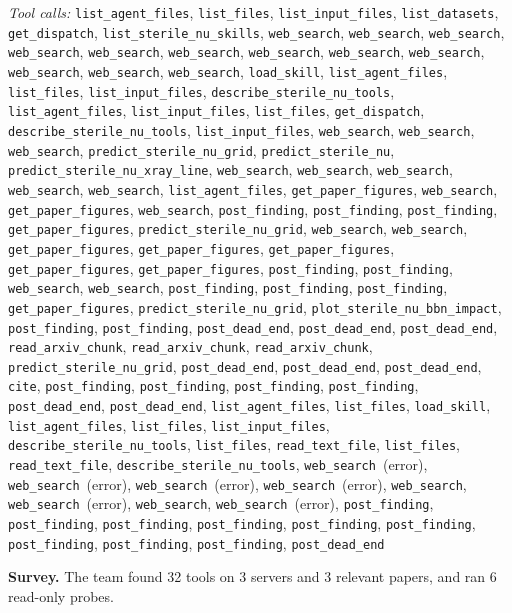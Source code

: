 \documentclass[11pt,a4paper]{article}
\begin{document}
\textit{Tool calls:} \texttt{list\_agent\_files}, \texttt{list\_files}, \texttt{list\_input\_files}, \texttt{list\_datasets}, \texttt{get\_dispatch}, \texttt{list\_sterile\_nu\_skills}, \texttt{web\_search}, \texttt{web\_search}, \texttt{web\_search}, \texttt{web\_search}, \texttt{web\_search}, \texttt{web\_search}, \texttt{web\_search}, \texttt{web\_search}, \texttt{web\_search}, \texttt{web\_search}, \texttt{web\_search}, \texttt{web\_search}, \texttt{load\_skill}, \texttt{list\_agent\_files}, \texttt{list\_files}, \texttt{list\_input\_files}, \texttt{describe\_sterile\_nu\_tools}, \texttt{list\_agent\_files}, \texttt{list\_input\_files}, \texttt{list\_files}, \texttt{get\_dispatch}, \texttt{describe\_sterile\_nu\_tools}, \texttt{list\_input\_files}, \texttt{web\_search}, \texttt{web\_search}, \texttt{web\_search}, \texttt{predict\_sterile\_nu\_grid}, \texttt{predict\_sterile\_nu}, \texttt{predict\_sterile\_nu\_xray\_line}, \texttt{web\_search}, \texttt{web\_search}, \texttt{web\_search}, \texttt{web\_search}, \texttt{web\_search}, \texttt{list\_agent\_files}, \texttt{get\_paper\_figures}, \texttt{web\_search}, \texttt{get\_paper\_figures}, \texttt{web\_search}, \texttt{post\_finding}, \texttt{post\_finding}, \texttt{post\_finding}, \texttt{get\_paper\_figures}, \texttt{predict\_sterile\_nu\_grid}, \texttt{web\_search}, \texttt{web\_search}, \texttt{get\_paper\_figures}, \texttt{get\_paper\_figures}, \texttt{get\_paper\_figures}, \texttt{get\_paper\_figures}, \texttt{get\_paper\_figures}, \texttt{post\_finding}, \texttt{post\_finding}, \texttt{web\_search}, \texttt{web\_search}, \texttt{post\_finding}, \texttt{post\_finding}, \texttt{post\_finding}, \texttt{get\_paper\_figures}, \texttt{predict\_sterile\_nu\_grid}, \texttt{plot\_sterile\_nu\_bbn\_impact}, \texttt{post\_finding}, \texttt{post\_finding}, \texttt{post\_dead\_end}, \texttt{post\_dead\_end}, \texttt{post\_dead\_end}, \texttt{read\_arxiv\_chunk}, \texttt{read\_arxiv\_chunk}, \texttt{read\_arxiv\_chunk}, \texttt{predict\_sterile\_nu\_grid}, \texttt{post\_dead\_end}, \texttt{post\_dead\_end}, \texttt{post\_dead\_end}, \texttt{cite}, \texttt{post\_finding}, \texttt{post\_finding}, \texttt{post\_finding}, \texttt{post\_finding}, \texttt{post\_dead\_end}, \texttt{post\_dead\_end}, \texttt{list\_agent\_files}, \texttt{list\_files}, \texttt{load\_skill}, \texttt{list\_agent\_files}, \texttt{list\_files}, \texttt{list\_input\_files}, \texttt{describe\_sterile\_nu\_tools}, \texttt{list\_files}, \texttt{read\_text\_file}, \texttt{list\_files}, \texttt{read\_text\_file}, \texttt{describe\_sterile\_nu\_tools}, \texttt{web\_search}~(error), \texttt{web\_search}~(error), \texttt{web\_search}~(error), \texttt{web\_search}~(error), \texttt{web\_search}, \texttt{web\_search}~(error), \texttt{web\_search}, \texttt{web\_search}~(error), \texttt{post\_finding}, \texttt{post\_finding}, \texttt{post\_finding}, \texttt{post\_finding}, \texttt{post\_finding}, \texttt{post\_finding}, \texttt{post\_finding}, \texttt{post\_finding}, \texttt{post\_finding}, \texttt{post\_dead\_end}\par
\textbf{Survey.} The team found 32 tools on 3 servers and 3 relevant papers, and ran 6 read-only probes.
\end{document}
